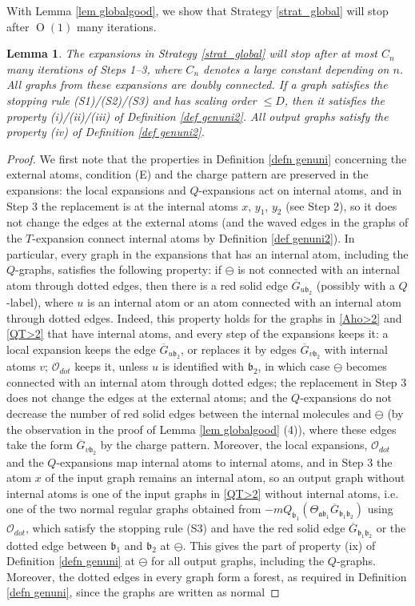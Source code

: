 \documentclass{article}
\newcommand{\1}{\mathds{1}}
\numberwithin{equation}{section}
\newcommand{\fa}{{\mathfrak a}}
\newcommand{\fb}{{\mathfrak b}}
\renewcommand{\cal}{\mathcal}
\renewcommand{\leq}{\leqslant}
\renewcommand{\le}{\leq}
\DeclareMathOperator{\OO}{O}
\theoremstyle{plain} %
\newtheorem{lemma}[theorem]{Lemma}
\theoremstyle{remark}
\begin{document}
With Lemma \ref{lem globalgood}, we show that Strategy \ref{strat_global} will stop after $\OO(1)$ many iterations.

\begin{lemma}\label{lemm expansionstrat}
The expansions in Strategy \ref{strat_global} will stop after at most $C_n$ many iterations of Steps 1--3, where $C_n$ denotes a large constant depending on $n$. All graphs from these expansions are doubly connected. If a graph satisfies the stopping rule (S1)/(S2)/(S3) and has scaling order $\le D$, then it satisfies the property (i)/(ii)/(iii) of Definition \ref{def genuni2}. All output graphs satisfy the property (iv) of Definition \ref{def genuni2}.
\end{lemma}
\begin{proof}
We first note that the properties in Definition \ref{defn genuni} concerning the external atoms, condition (E) and the charge pattern are preserved in the expansions: the local expansions and $Q$-expansions act on internal atoms, and in Step 3 the replacement is at the internal atoms $x$, $y_1$, $y_2$ (see Step 2), so it does not change the edges at the external atoms (and the waved edges in the graphs of the $T$-expansion connect internal atoms by Definition \ref{def genuni2}). In particular, every graph in the expansions that has an internal atom, including the $Q$-graphs, satisfies the following property: if $\ominus$ is not connected with an internal atom through dotted edges, then there is a red solid edge $\overline G_{u\fb_2}$ (possibly with a $Q$-label), where $u$ is an internal atom or an atom connected with an internal atom through dotted edges. Indeed, this property holds for the graphs in \eqref{Aho>2} and \eqref{QT>2} that have internal atoms, and every step of the expansions keeps it: a local expansion keeps the edge $\overline G_{u\fb_2}$, or replaces it by edges $\overline G_{v\fb_2}$ with internal atoms $v$; $\cal O_{dot}$ keeps it, unless $u$ is identified with $\fb_2$, in which case $\ominus$ becomes connected with an internal atom through dotted edges; the replacement in Step 3 does not change the edges at the external atoms; and the $Q$-expansions do not decrease the number of red solid edges between the internal molecules and $\ominus$ (by the observation in the proof of Lemma \ref{lem globalgood} (4)), where these edges take the form $\overline G_{v\fb_2}$ by the charge pattern. Moreover, the local expansions, $\cal O_{dot}$ and the $Q$-expansions map internal atoms to internal atoms, and in Step 3 the atom $x$ of the input graph remains an internal atom, so an output graph without internal atoms is one of the input graphs in \eqref{QT>2} without internal atoms, i.e. one of the two normal regular graphs obtained from $- m Q_{\fb_1} ( \Theta_{\fa\fb_1} \overline G_{\fb_1 \fb_2})$ using $\cal O_{dot}$, which satisfy the stopping rule (S3) and have the red solid edge $\overline G_{\fb_1\fb_2}$ or the dotted edge between $\fb_1$ and $\fb_2$ at $\ominus$. This gives the part of property (ix) of Definition \ref{defn genuni} at $\ominus$ for all output graphs, including the $Q$-graphs. Moreover, the dotted edges in every graph form a forest, as required in Definition \ref{defn genuni}, since the graphs are written as normal 
\end{proof}
\end{document}
